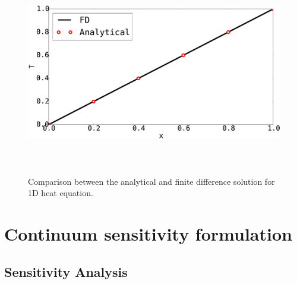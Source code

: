 \begin{figure}[h]
	\centering
	\includegraphics[height=9.00cm]{Chapter_2/figure/finitedifference_vs_analytical.eps}
	\caption{Comparison between the analytical and finite difference solution for 1D heat equation.}
	\label{fig:C2_verificationOfSolver}
\end{figure}


\section{Continuum sensitivity formulation}

\subsection{Sensitivity Analysis}
